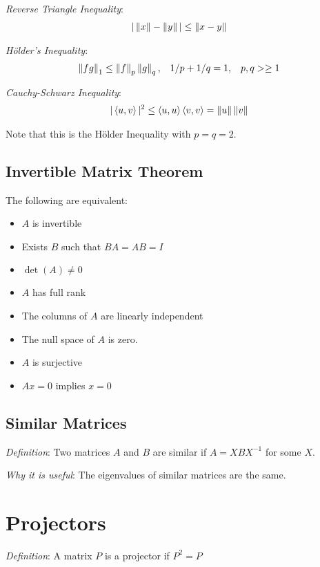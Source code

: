 \documentclass[12pt]{article}
\begin{document}
\textit{Reverse Triangle Inequality}:
\begin{align*}
    |\left\lVert x\right\rVert-\left\lVert y\right\rVert| \leq \left\lVert x-y\right\rVert
\end{align*}

\textit{H\"older's Inequality}:
\begin{align*}
    \left\lVert fg\right\rVert_1 \leq \left\lVert f\right\rVert_p\left\lVert g\right\rVert_q, && 1/p+1/q=1, &&p,q>\geq 1
\end{align*}

\textit{Cauchy-Schwarz Inequality}:
\begin{align*}
    |\left\langle u,v \right\rangle|^2 \leq \left\langle u,u \right\rangle\left\langle v,v \right\rangle = \left\lVert u\right\rVert\left\lVert v\right\rVert
\end{align*}

Note that this is the H\"older Inequality with \( p=q=2 \).


\subsection{Invertible Matrix Theorem}
The following are equivalent:
\begin{itemize}[nolistsep]
    \item \( A \) is invertible
    \item Exists \( B \) such that \( BA = AB = I \)
    \item \( \det(A) \neq 0 \)
    \item \( A \) has full rank
    \item The columns of \( A \) are linearly independent
    \item The null space of \( A \) is zero.
    \item \( A \) is surjective
    \item \( Ax = 0 \) implies \( x = 0 \)
\end{itemize}


\subsection{Similar Matrices}
\textit{Definition}: Two matrices \( A \) and \( B \) are similar if \( A = XBX^{-1} \) for some \( X \).

\textit{Why it is useful}: The eigenvalues of similar matrices are the same.

\pagebreak
\section{Projectors}
\textit{Definition}: A matrix \( P \) is a projector if \( P^2 = P \)
\end{document}
